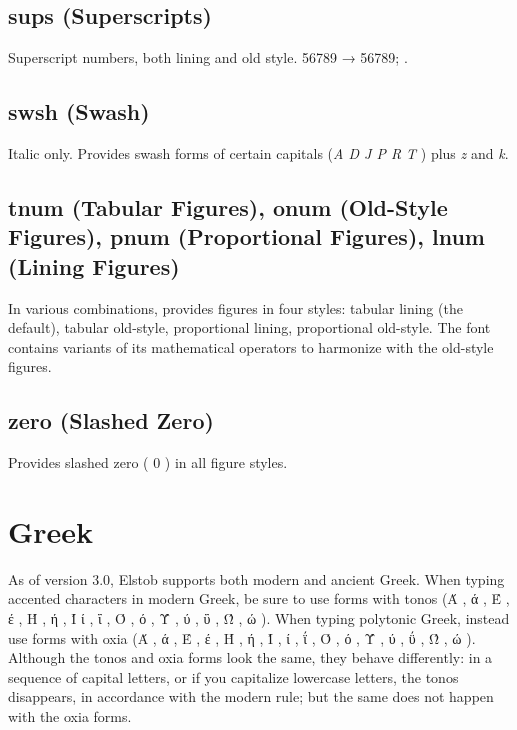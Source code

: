\documentclass[12pt,letterpaper,openany]{book}
\begin{document}
\section{sups (Superscripts)}
Superscript numbers, both lining and old style. 56789 →
{ 56789};
.

\section{swsh (Swash)}
Italic only. Provides swash forms of certain capitals
{(\textit{A D J P R T} ) plus \textit{z} and \textit{k}.}

\section{tnum (Tabular Figures), onum (Old-Style Figures), pnum (Proportional
Figures), lnum (Lining Figures)}
In various combinations, provides figures in four styles:
tabular lining (the default),
tabular old-style,
proportional lining,
proportional old-style. The font contains variants of its mathematical
operators to harmonize with the old-style figures.

\section{zero (Slashed Zero)}
Provides slashed zero ({ 0 }) in all figure styles.

\chapter{Greek}

As of version 3.0, Elstob supports both modern and ancient Greek.
When typing accented characters in modern Greek, be sure to use
forms with tonos (Ά , ά , Έ , έ , Ή , ή ,
Ί  ί , ΐ , Ό , ό , Ύ , ύ , ΰ ,
Ώ , ώ ). When typing polytonic Greek, instead
use forms with oxia (Ά , ά , Έ , έ , Ή , ή ,
Ί , ί , ΐ , Ό , ό ,
Ύ , ύ , ΰ ,
Ώ , ώ ). Although the tonos and oxia forms look the same, they
behave differently: in a sequence of capital letters, or if you capitalize lowercase
letters, the tonos disappears,
in accordance with the modern rule; but the same does not happen with the oxia forms.
\end{document}
